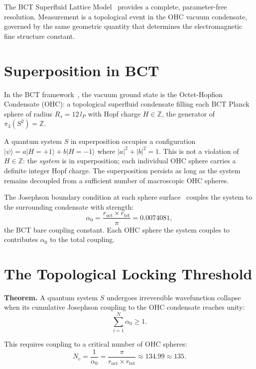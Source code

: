 \documentclass[aps,prl,twocolumn,superscriptaddress,showpacs]{revtex4-2}
\begin{document}
The BCT Superfluid Lattice Model~\cite{BCT_Monograph} provides a 
complete, parameter-free resolution. Measurement is a topological event 
in the OHC vacuum condensate, governed by the same geometric quantity 
that determines the electromagnetic fine structure constant.

\section{Superposition in BCT}

In the BCT framework~\cite{BCT_AppJH}, the vacuum ground state is the 
Octet-Hopfion Condensate (OHC): a topological superfluid condensate 
filling each BCT Planck sphere of radius $R_s = 12\,l_P$ with Hopf 
charge $H \in \mathbb{Z}$, the generator of $\pi_3(S^2) = \mathbb{Z}$.

A quantum system $S$ in superposition occupies a configuration 
$|\psi\rangle = a|H{=}{+}1\rangle + b|H{=}{-}1\rangle$
where $|a|^2 + |b|^2 = 1$. This is not a violation of $H\in\mathbb{Z}$: 
the \emph{system} is in superposition; each individual OHC sphere carries 
a definite integer Hopf charge. The superposition persists as long as the 
system remains decoupled from a sufficient number of macroscopic OHC spheres.

The Josephson boundary condition at each sphere surface~\cite{BCT_AppJH} 
couples the system to the surrounding condensate with strength:
\begin{equation}
\alpha_0 = \frac{r_\mathrm{oct}\times r_\mathrm{tet}}{\pi} = 0.0074081,
\end{equation}
the BCT bare coupling constant. Each OHC sphere the system couples to 
contributes $\alpha_0$ to the total coupling.

\section{The Topological Locking Threshold}

\textbf{Theorem.} A quantum system $S$ undergoes irreversible wavefunction 
collapse when its cumulative Josephson coupling to the OHC condensate 
reaches unity:
\begin{equation}
\sum_{i=1}^{N} \alpha_0 \geq 1.
\end{equation}

This requires coupling to a critical number of OHC spheres:
\begin{equation}
\boxed{N_c = \frac{1}{\alpha_0} = \frac{\pi}{r_\mathrm{oct}\times r_\mathrm{tet}} 
\approx 134.99 \approx 135.}
\end{equation}
\end{document}
